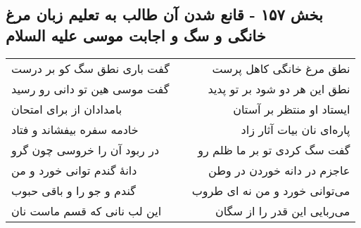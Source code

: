\begin{center}
\section*{بخش ۱۵۷ - قانع شدن آن طالب به تعلیم زبان مرغ خانگی و سگ و اجابت موسی علیه السلام}
\label{sec:sh157}
\begin{longtable}{l p{0.5cm} r}
گفت باری نطق سگ کو بر درست
&&
نطق مرغ خانگی کاهل پرست
\\
گفت موسی هین تو دانی رو رسید
&&
نطق این هر دو شود بر تو پدید
\\
بامدادان از برای امتحان
&&
ایستاد او منتظر بر آستان
\\
خادمه سفره بیفشاند و فتاد
&&
پاره‌ای نان بیات آثار زاد
\\
در ربود آن را خروسی چون گرو
&&
گفت سگ کردی تو بر ما ظلم رو
\\
دانهٔ گندم توانی خورد و من
&&
عاجزم در دانه خوردن در وطن
\\
گندم و جو را و باقی حبوب
&&
می‌توانی خورد و من نه ای طروب
\\
این لب نانی که قسم ماست نان
&&
می‌ربایی این قدر را از سگان
\\
\end{longtable}
\end{center}
